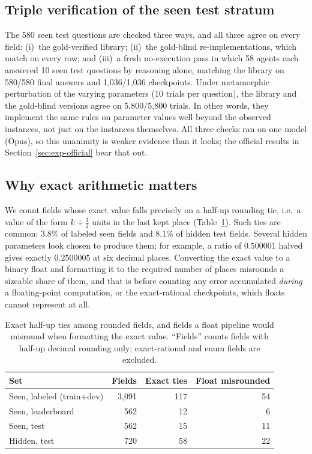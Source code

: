 \documentclass[conference]{IEEEtran}
\begin{document}
\subsection{Triple verification of the seen test stratum}\label{sec:exp-triple}
The 580 seen test questions are checked three ways, and all three agree on every field: (i)~the gold-verified
library; (ii)~the gold-blind re-implementations, which match on every row; and (iii)~a fresh no-execution pass in
which 58 agents each answered 10 seen test questions by reasoning alone, matching the library on 580/580 final answers
and 1{,}036/1{,}036 checkpoints. Under metamorphic perturbation of the varying parameters (10 trials per question), the
library and the gold-blind versions agree on 5{,}800/5{,}800 trials. In other words, they implement the same rules on
parameter values well beyond the observed instances, not just on the instances themselves. All three checks ran on one
model (Opus), so this unanimity is weaker evidence than it looks; the official results in
Section~\ref{sec:exp-official} bear that out.

\subsection{Why exact arithmetic matters}
We count fields whose exact value falls precisely on a half-up rounding tie, i.e.\ a value of the form
$k+\tfrac12$ units in the last kept place (Table~\ref{tab:ties}). Such ties are common: 3.8\% of labeled seen fields
and 8.1\% of hidden test fields. Several hidden parameters look chosen to produce them; for example, a ratio of
$0.500001$ halved gives exactly $0.2500005$ at six decimal places. Converting the exact value to a binary float and
formatting it to the required
number of places misrounds a sizeable share of them, and that is before counting any error accumulated
\emph{during} a floating-point computation, or the exact-rational checkpoints, which floats cannot represent at all.

\begin{table}[t]
\centering
\caption{Exact half-up ties among rounded fields, and fields a float pipeline would misround when formatting the exact
value. ``Fields'' counts fields with half-up decimal rounding only; exact-rational and enum fields are excluded.}
\label{tab:ties}
\begin{tabular}{lrrr}
\toprule
Set & Fields & Exact ties & Float misrounded \\
\midrule
Seen, labeled (train+dev) & 3{,}091 & 117 & 54 \\
Seen, leaderboard & 562 & 12 & 6 \\
Seen, test & 562 & 15 & 11 \\
Hidden, test & 720 & 58 & 22 \\
\bottomrule
\end{tabular}
\end{table}
\end{document}
